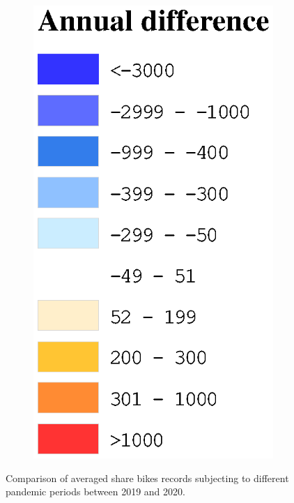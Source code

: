 \documentclass[preprints,ijgi,submit,moreauthors]{Definitions/mdpi}
\begin{document}
\begin{figure}[ht]
\begin{subfigure}{.14\textwidth}
        \includegraphics[width=\textwidth]{Figures/AnnualDifLegend.eps}
    \end{subfigure}
    \caption{Comparison of averaged share bikes records subjecting to different pandemic periods between 2019 and 2020.}
    \label{fig:compare_2019_and_2020}
\end{figure}
\end{document}
